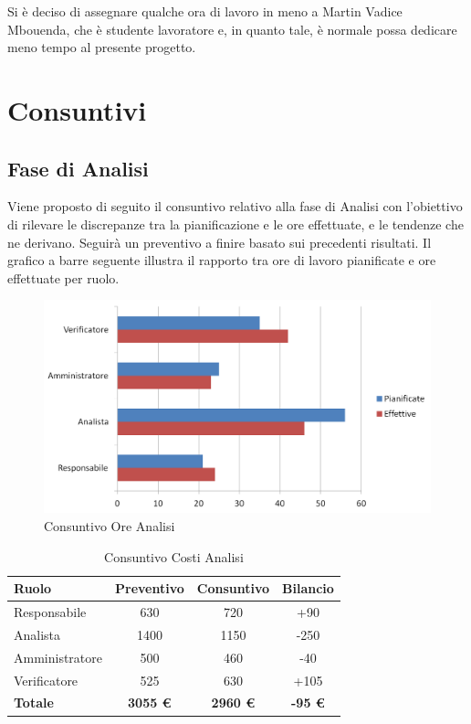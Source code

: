 \documentclass[a4paper,11pt]{article}
\begin{document}
	Si è deciso di assegnare qualche ora di lavoro in meno a Martin Vadice Mbouenda, che è studente lavoratore e, in quanto tale, è normale possa dedicare meno tempo al presente progetto.
	\newpage
		
	\section{Consuntivi}
	\subsection{Fase di Analisi}
	Viene proposto di seguito il consuntivo relativo alla fase di Analisi con l'obiettivo di rilevare le discrepanze tra la pianificazione e le ore effettuate, e le tendenze che ne derivano. Seguirà un preventivo a finire basato sui precedenti risultati.
	\newline
	Il grafico a barre seguente illustra il rapporto tra ore di lavoro pianificate e ore effettuate per ruolo.
	\begin{figure}[h!]
		\centering
		\includegraphics[scale=0.7]{../Images/chart-Consuntivo_Ore_Analisi}
	\caption{Consuntivo Ore Analisi}
	\end{figure}
	
	\begin{table}[h!]
	\begin{center}
		\begin{tabular}{l c c c}
			\textbf{Ruolo} & \textbf{Preventivo} & \textbf{Consuntivo} &\textbf{Bilancio}\\
			\midrule
			Responsabile 	& 630 	& 720	& +90	\\
			Analista 		& 1400 	& 1150	& -250	\\
			Amministratore 	& 500 	& 460	& -40	\\
			Verificatore 	& 525 	& 630	& +105	\\
			\midrule
			\textbf{Totale} & \textbf{3055 \euro} & \textbf{2960 \euro}	& \textbf{-95 \euro}
		\end{tabular}
		\end{center}
	\caption{Consuntivo Costi Analisi}
	\end{table}
\end{document}
